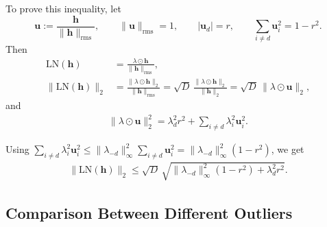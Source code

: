 \documentclass{article} %
\begin{document}
To prove this inequality, let
\[
\mathbf{u} := \frac{\mathbf{h}}{\lVert \mathbf{h} \rVert_{\mathrm{rms}}},\qquad \lVert \mathbf{u} \rVert_{\mathrm{rms}}=1,\qquad |\mathbf{u}_d|=r,\qquad \sum_{i\neq d}\mathbf{u}_i^2 = 1-r^2.
\]
Then
\begin{align}
\mathrm{LN}(\mathbf{h}) &= \frac{\lambda\odot \mathbf{h}}{\lVert \mathbf{h} \rVert_{\mathrm{rms}}},\\
\lVert \mathrm{LN}(\mathbf{h}) \rVert_2 &= \frac{\lVert \lambda\odot \mathbf{h} \rVert_2}{\lVert \mathbf{h} \rVert_{\mathrm{rms}}}
= \sqrt{D}\,\frac{\lVert \lambda\odot \mathbf{h} \rVert_2}{\lVert \mathbf{h} \rVert_2}
= \sqrt{D}\,\lVert \lambda\odot \mathbf{u} \rVert_2,
\end{align}
and
\begin{align}
\lVert \lambda\odot \mathbf{u} \rVert_2^2
= \lambda_d^2 r^2 + \sum_{i\neq d}\lambda_i^2 \mathbf{u}_i^2.
\end{align}

Using $\sum_{i\neq d}\lambda_i^2 \mathbf{u}_i^2 \le \lVert \lambda_{-d} \rVert_\infty^2\sum_{i\neq d}\mathbf{u}_i^2
= \lVert \lambda_{-d} \rVert_\infty^2(1-r^2)$, we get
\begin{align}
\lVert \mathrm{LN}(\mathbf{h}) \rVert_2
\le \sqrt{D}\,\sqrt{\lVert \lambda_{-d} \rVert_\infty^2(1-r^2)+\lambda_d^2 r^2}.
\end{align}


\subsection{Comparison Between Different Outliers}
\label{app:comparision}
\end{document}

